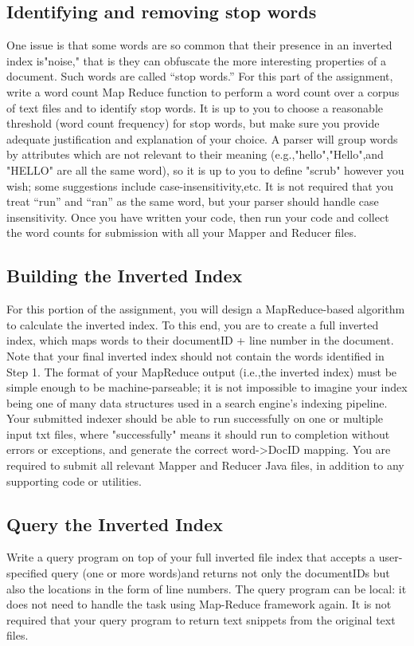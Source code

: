 \subsection{Identifying and removing stop words}
One issue is that some words are so common that their presence in an inverted index is"noise," that is they can obfuscate the more interesting properties of a document. Such words are called “stop words.” For this part of the assignment, write a word count Map Reduce function to perform a word count over a corpus of text files and to identify stop words. It is up to you to choose a reasonable threshold (word count frequency) for stop words, but make sure you provide adequate justification and explanation of your choice. A parser will group words by attributes which are not relevant to their meaning (e.g.,"hello","Hello",and "HELLO" are all the same word), so it is up to you to  define "scrub" however you wish; some suggestions include case-insensitivity,etc. It is not required that you treat “run” and “ran” as the same word, but your parser should handle case insensitivity. Once you have written your code, then run your code and collect the word counts for submission with all your Mapper and Reducer files. 
\subsection{Building the Inverted Index}
For this portion of the assignment, you  will design a MapReduce-based algorithm to calculate the inverted index. To this end, you are to create a full inverted index, which maps words to their documentID  + line number in the document. Note that your final inverted index should not contain the words identified in Step 1. The format of your MapReduce output (i.e.,the inverted index) must be simple enough to be machine-parseable; it is not impossible to  imagine your index  being one of many data structures used  in a search engine's indexing pipeline. Your submitted indexer should be  able to run successfully on one or multiple input txt files, where "successfully" means it should run to completion without errors or exceptions, and generate the correct word->DocID mapping. You are required to submit all relevant Mapper and Reducer Java files, in addition to any supporting code or utilities. 
\subsection{Query the Inverted Index}
Write a query program on top of your full inverted file index that accepts a user-specified query (one or more words)and returns not only the documentIDs but also the locations in the form of line numbers. The query program can be local: it does not need to handle the task using Map-Reduce framework again. It is not required that your query program to return text snippets from the original text files.